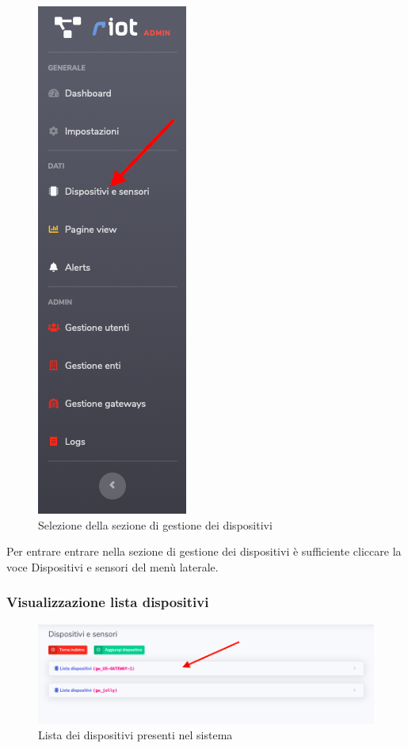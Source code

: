		\begin{figure}[H]
		\centering
		\includegraphics[scale=0.600]{res/images/admin/menuDisp.png}
		\caption{Selezione della sezione di gestione dei dispositivi}
	\end{figure}

		Per entrare entrare nella sezione di gestione dei dispositivi è sufficiente cliccare la voce Dispositivi e sensori del menù laterale.

	\subsubsection{Visualizzazione lista dispositivi}

		\begin{figure}[H]
		\centering
		\includegraphics[scale=0.480]{res/images/admin/listaDisp.png}
		\caption{Lista dei dispositivi presenti nel sistema}
	\end{figure}

